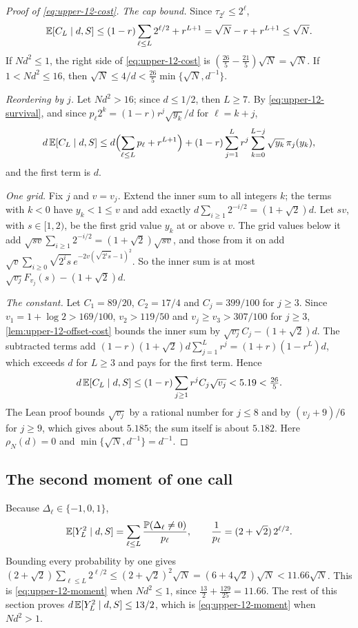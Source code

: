 \begin{proof}[Proof of \eqref{eq:upper-12-cost}]
\emph{The cap bound.} Since $\tau_{2^\ell}\le2^\ell$,
\[
 \mathbb E[C_L\mid d,S]\le(1-r)\sum_{\ell\le L}2^{\ell/2}+r^{L+1}
 =\sqrt N-r+r^{L+1}\le\sqrt N .
\]
If $Nd^2\le1$, the right side of \eqref{eq:upper-12-cost} is
$(\tfrac{26}{5}-\tfrac{21}{5})\sqrt N=\sqrt N$. If $1<Nd^2\le16$, then
$\sqrt N\le4/d<\tfrac{26}{5}\min\{\sqrt N,d^{-1}\}$.

\emph{Reordering by $j$.} Let $Nd^2>16$; since $d\le1/2$, then $L\ge7$.
By \eqref{eq:upper-12-survival}, and since
$p_\ell2^k=(1-r)r^j\sqrt{y_k}/d$ for $\ell=k+j$,
\[
 d\,\mathbb E[C_L\mid d,S]\le d\Bigl(\sum_{\ell\le L}p_\ell+r^{L+1}\Bigr)
 +(1-r)\sum_{j=1}^Lr^j\sum_{k=0}^{L-j}\sqrt{y_k}\,\pi_j(y_k),
\]
and the first term is $d$.

\emph{One grid.} Fix $j$ and $v=v_j$. Extend the inner sum to all
integers $k$; the terms with $k<0$ have $y_k<1\le v$ and add exactly
$d\sum_{i\ge1}2^{-i/2}=(1+\sqrt2)d$. Let $sv$, with $s\in[1,2)$, be the
first grid value $y_k$ at or above $v$. The grid values below it add
$\sqrt{sv}\sum_{i\ge1}2^{-i/2}=(1+\sqrt2)\sqrt{sv}$, and those from it on
add $\sqrt v\sum_{i\ge0}\sqrt{2^is}\,e^{-2v(\sqrt{2^is}-1)^2}$. So the
inner sum is at most $\sqrt{v_j}F_{v_j}(s)-(1+\sqrt2)d$.

\emph{The constant.} Let $C_1=89/20$, $C_2=17/4$ and $C_j=399/100$ for
$j\ge3$. Since $v_1=1+\log2>169/100$, $v_2>119/50$ and
$v_j\ge v_3>307/100$ for $j\ge3$, \cref{lem:upper-12-offset-cost} bounds
the inner sum by $\sqrt{v_j}C_j-(1+\sqrt2)d$. The subtracted terms add
$(1-r)(1+\sqrt2)d\sum_{j=1}^Lr^j=(1+r)(1-r^L)d$, which exceeds $d$ for
$L\ge3$ and pays for the first term. Hence
\[
 d\,\mathbb E[C_L\mid d,S]\le(1-r)\sum_{j\ge1}r^jC_j\sqrt{v_j}<5.19<\tfrac{26}{5}.
\]
The Lean proof bounds $\sqrt{v_j}$ by a rational number for $j\le8$ and by
$(v_j+9)/6$ for $j\ge9$, which gives about $5.185$; the sum itself is about
$5.182$. Here $\rho_N(d)=0$ and $\min\{\sqrt N,d^{-1}\}=d^{-1}$.
\end{proof}

\subsection{The second moment of one call}

Because $\Delta_\ell\in\{-1,0,1\}$,
\[
 \mathbb E[Y_L^2\mid d,S]=\sum_{\ell\le L}\frac{\mathbb P(\Delta_\ell\ne0)}{p_\ell},
 \qquad \frac1{p_\ell}=(2+\sqrt2)\,2^{\ell/2}.
\]
Bounding every probability by one gives
$(2+\sqrt2)\sum_{\ell\le L}2^{\ell/2}\le(2+\sqrt2)^2\sqrt N
=(6+4\sqrt2)\sqrt N<11.66\sqrt N$. This is
\eqref{eq:upper-12-moment} when $Nd^2\le1$, since
$\tfrac{13}{2}+\tfrac{129}{25}=11.66$. The rest of this section
proves $d\,\mathbb E[Y_L^2\mid d,S]\le13/2$, which is
\eqref{eq:upper-12-moment} when $Nd^2>1$.

